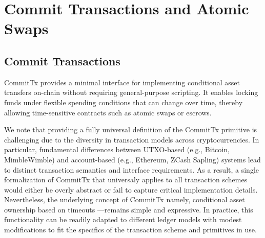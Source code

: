 
\section{Commit Transactions and Atomic Swaps}

\subsection{Commit Transactions}
CommitTx provides a minimal interface for implementing conditional asset transfers on-chain without requiring general-purpose scripting. It enables locking funds under flexible spending conditions that can change over time, thereby allowing time-sensitive contracts such as atomic swaps or escrows.

We note that providing a fully universal definition of the CommitTx primitive is challenging due to the diversity in transaction models across cryptocurrencies. In particular, fundamental differences between UTXO-based (e.g., Bitcoin, MimbleWimble) and account-based (e.g., Ethereum, ZCash Sapling) systems lead to distinct transaction semantics and interface requirements. As a result, a single formalization of CommitTx that universaly applies to all transaction schemes would either be overly abstract or fail to capture critical implementation details. Nevertheless, the underlying concept of CommitTx  namely, conditional asset ownership based on timeouts —remains simple and expressive. In practice, this functionality can be readily adapted to different ledger models with modest modifications to fit the specifics of the transaction scheme and primitives in use.

